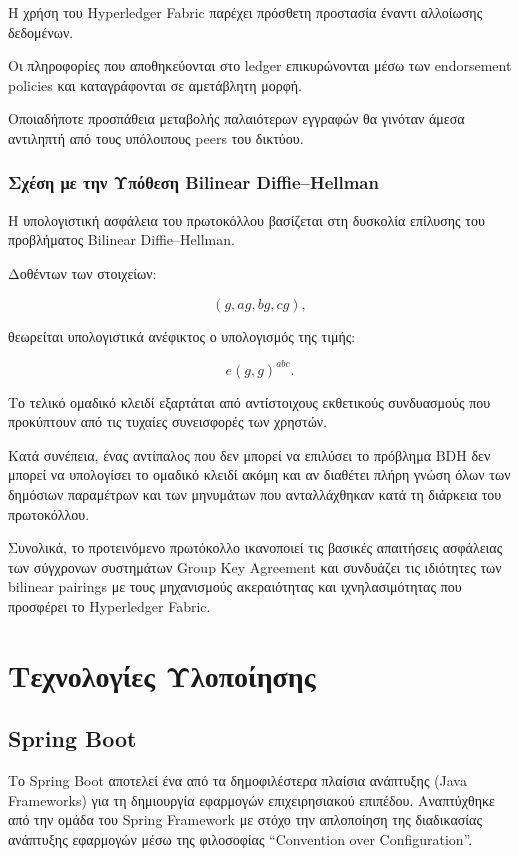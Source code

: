 \documentclass[12pt,a4paper]{report}
\begin{document}
Η χρήση του Hyperledger Fabric παρέχει πρόσθετη προστασία έναντι αλλοίωσης δεδομένων.

Οι πληροφορίες που αποθηκεύονται στο ledger επικυρώνονται μέσω των endorsement policies και καταγράφονται σε αμετάβλητη μορφή.

Οποιαδήποτε προσπάθεια μεταβολής παλαιότερων εγγραφών θα γινόταν άμεσα αντιληπτή από τους υπόλοιπους peers του δικτύου.

\subsection{Σχέση με την Υπόθεση Bilinear Diffie--Hellman}

Η υπολογιστική ασφάλεια του πρωτοκόλλου βασίζεται στη δυσκολία επίλυσης του προβλήματος Bilinear Diffie--Hellman.

Δοθέντων των στοιχείων:

\[
(g,ag,bg,cg),
\]

θεωρείται υπολογιστικά ανέφικτος ο υπολογισμός της τιμής:

\[
e(g,g)^{abc}.
\]

Το τελικό ομαδικό κλειδί εξαρτάται από αντίστοιχους εκθετικούς συνδυασμούς που προκύπτουν από τις τυχαίες συνεισφορές των χρηστών.

Κατά συνέπεια, ένας αντίπαλος που δεν μπορεί να επιλύσει το πρόβλημα BDH δεν μπορεί να υπολογίσει το ομαδικό κλειδί ακόμη και αν διαθέτει πλήρη γνώση όλων των δημόσιων παραμέτρων και των μηνυμάτων που ανταλλάχθηκαν κατά τη διάρκεια του πρωτοκόλλου.

Συνολικά, το προτεινόμενο πρωτόκολλο ικανοποιεί τις βασικές απαιτήσεις ασφάλειας των σύγχρονων συστημάτων Group Key Agreement και συνδυάζει τις ιδιότητες των bilinear pairings με τους μηχανισμούς ακεραιότητας και ιχνηλασιμότητας που προσφέρει το Hyperledger Fabric.
\chapter{Τεχνολογίες Υλοποίησης}
\section{Spring Boot}

Το Spring Boot αποτελεί ένα από τα δημοφιλέστερα πλαίσια ανάπτυξης
(Java Frameworks) για τη δημιουργία εφαρμογών επιχειρησιακού επιπέδου.
Αναπτύχθηκε από την ομάδα του Spring Framework με στόχο την
απλοποίηση της διαδικασίας ανάπτυξης εφαρμογών μέσω της φιλοσοφίας
``Convention over Configuration''.
\end{document}

